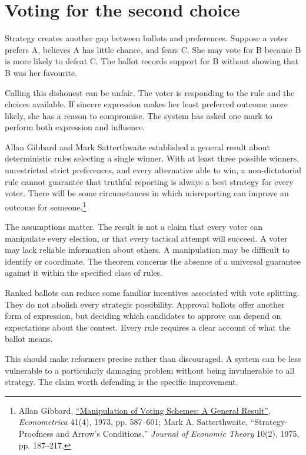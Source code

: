 \documentclass[12pt,a4paper]{book}
\begin{document}
\section*{Voting for the second choice}

Strategy creates another gap between ballots and preferences. Suppose a voter prefers A, believes A has little chance, and fears C. She may vote for B because B is more likely to defeat C. The ballot records support for B without showing that B was her favourite.

Calling this dishonest can be unfair. The voter is responding to the rule and the choices available. If sincere expression makes her least preferred outcome more likely, she has a reason to compromise. The system has asked one mark to perform both expression and influence.

Allan Gibbard and Mark Satterthwaite established a general result about deterministic rules selecting a single winner. With at least three possible winners, unrestricted strict preferences, and every alternative able to win, a non-dictatorial rule cannot guarantee that truthful reporting is always a best strategy for every voter. There will be some circumstances in which misreporting can improve an outcome for someone.\footnote{Allan Gibbard, \href{https://www.eecs.harvard.edu/cs286r/courses/fall11/papers/Gibbard73.pdf}{``Manipulation of Voting Schemes: A General Result''}, \emph{Econometrica} 41(4), 1973, pp. 587--601; Mark A. Satterthwaite, ``Strategy-Proofness and Arrow's Conditions,'' \emph{Journal of Economic Theory} 10(2), 1975, pp. 187--217.}

The assumptions matter. The result is not a claim that every voter can manipulate every election, or that every tactical attempt will succeed. A voter may lack reliable information about others. A manipulation may be difficult to identify or coordinate. The theorem concerns the absence of a universal guarantee against it within the specified class of rules.

Ranked ballots can reduce some familiar incentives associated with vote splitting. They do not abolish every strategic possibility. Approval ballots offer another form of expression, but deciding which candidates to approve can depend on expectations about the contest. Every rule requires a clear account of what the ballot means.

This should make reformers precise rather than discouraged. A system can be less vulnerable to a particularly damaging problem without being invulnerable to all strategy. The claim worth defending is the specific improvement.
\end{document}
